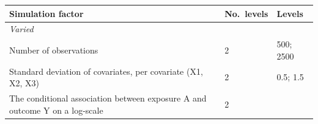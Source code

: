\documentclass[10,a4paperpaper,]{article}
\begin{document}
\begin{longtable}[]{@{}lll@{}}
\toprule
\begin{minipage}[b]{0.37\columnwidth}\raggedright
Simulation factor\strut
\end{minipage} & \begin{minipage}[b]{0.12\columnwidth}\raggedright
No.~levels\strut
\end{minipage} & \begin{minipage}[b]{0.43\columnwidth}\raggedright
Levels\strut
\end{minipage}\tabularnewline
\midrule
\endhead
\begin{minipage}[t]{0.37\columnwidth}\raggedright
\emph{Varied}\strut
\end{minipage} & \begin{minipage}[t]{0.12\columnwidth}\raggedright
\strut
\end{minipage} & \begin{minipage}[t]{0.43\columnwidth}\raggedright
\strut
\end{minipage}\tabularnewline
\begin{minipage}[t]{0.37\columnwidth}\raggedright
Number of observations\strut
\end{minipage} & \begin{minipage}[t]{0.12\columnwidth}\raggedright
2\strut
\end{minipage} & \begin{minipage}[t]{0.43\columnwidth}\raggedright
500; 2500\strut
\end{minipage}\tabularnewline
\begin{minipage}[t]{0.37\columnwidth}\raggedright
Standard deviation of covariates, per covariate (X1, X2, X3)\strut
\end{minipage} & \begin{minipage}[t]{0.12\columnwidth}\raggedright
2\strut
\end{minipage} & \begin{minipage}[t]{0.43\columnwidth}\raggedright
0.5; 1.5\strut
\end{minipage}\tabularnewline
\begin{minipage}[t]{0.37\columnwidth}\raggedright
The conditional association between exposure A and outcome Y on a
log-scale\strut
\end{minipage} & \begin{minipage}[t]{0.12\columnwidth}\raggedright
2\strut
\end{minipage} & \begin{minipage}[t]{0.43\columnwidth}\raggedright

\end{minipage}
\end{longtable}
\end{document}
